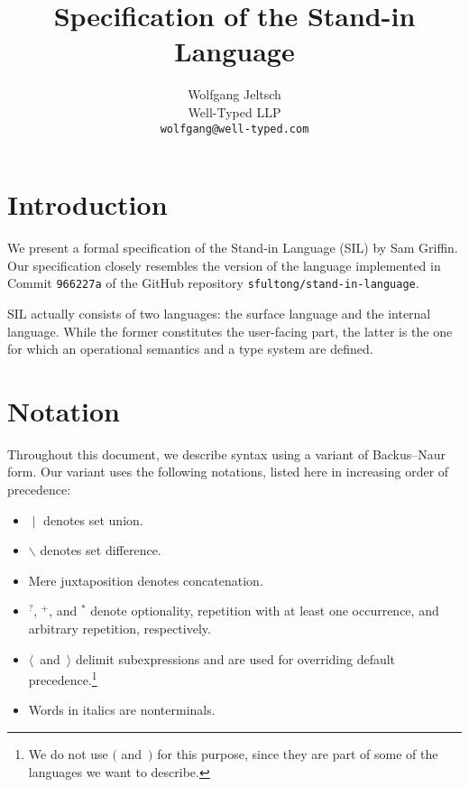 \documentclass{scrartcl}
\title{Specification of the Stand-in Language}
\author{%
    Wolfgang Jeltsch\\
    \small Well-Typed LLP\\
    \small\texttt{wolfgang@well-typed.com}%
}
\newcommand{\optional}{^{?}}
\newcommand{\some}{^{+}}
\newcommand{\many}{^{*}}
\begin{document}
\maketitle

\section{Introduction}

We present a formal specification of the Stand-in Language (SIL) by Sam
Griffin. Our specification closely resembles the version of the language
implemented in Commit \texttt{966227a} of the GitHub repository
\texttt{sfultong/stand-in-language}.

SIL actually consists of two languages: the surface language and the
internal language. While the former constitutes the user-facing part,
the latter is the one for which an operational semantics and a type
system are defined.

\section{Notation}

Throughout this document, we describe syntax using a variant of
Backus–Naur form. Our variant uses the following notations, listed here
in increasing order of precedence:
\begin{itemize}

\item

$∣$ denotes set union.

\item

$∖$ denotes set difference.

\item

Mere juxtaposition denotes concatenation.

\item

$\optional$, $\some$, and $\many$ denote optionality, repetition with at
least one occurrence, and arbitrary repetition, respectively.

\item

$⟨$~and~$⟩$ delimit subexpressions and are used for overriding default
precedence.\footnote{We do not use $($ and~$)$ for this purpose, since
they are part of some of the languages we want to describe.}

\item

Words in italics are nonterminals.

\end{itemize}
\end{document}
